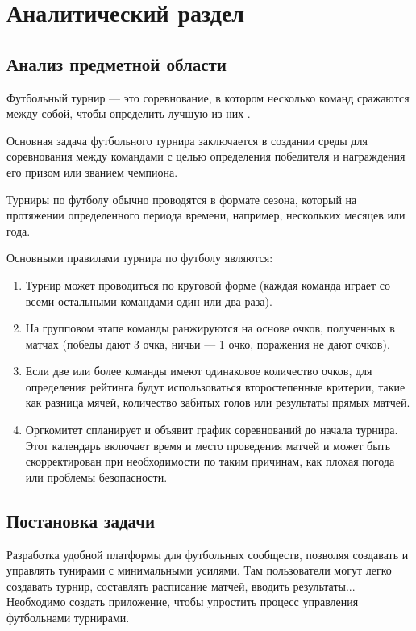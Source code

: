 \section{Аналитический раздел}


\subsection{Анализ предметной области}

Футбольный турнир --- это соревнование, в котором несколько команд сражаются между собой, чтобы определить лучшую из них \cite{raytracin}.

Основная задача футбольного турнира заключается в создании среды для соревнования между командами с целью определения победителя и награждения его призом или званием чемпиона.

Турниры по футболу обычно проводятся в формате сезона, который на протяжении определенного периода времени, например, нескольких месяцев или года.

Основными правилами турнира по футболу являются:
\begin{enumerate}
	\item Турнир может проводиться по круговой форме (каждая команда играет со всеми остальными командами один или два раза).
	\item На групповом этапе команды ранжируются на основе очков, полученных в матчах (победы дают 3 очка, ничьи --- 1 очко, поражения не дают очков).
	\item Если две или более команды имеют одинаковое количество очков, для определения рейтинга будут использоваться второстепенные критерии, такие как разница мячей, количество забитых голов или результаты прямых матчей.
	\item Оргкомитет спланирует и объявит график соревнований до начала турнира. Этот календарь включает время и место проведения матчей и может быть скорректирован при необходимости по таким причинам, как плохая погода или проблемы безопасности.
\end{enumerate}
\subsection{Постановка задачи}
Разработка удобной платформы для футбольных сообществ, позволяя создавать и управлять тунирами с минимальными усилями. Там пользователи могут легко создавать турнир, составлять расписание матчей, вводить результаты...
Необходимо создать приложение, чтобы упростить процесс управления футбольнами турнирами.

